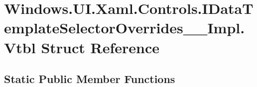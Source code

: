 \hypertarget{struct_windows_1_1_u_i_1_1_xaml_1_1_controls_1_1_i_data_template_selector_overrides_____impl_1_1_vtbl}{}\section{Windows.\+U\+I.\+Xaml.\+Controls.\+I\+Data\+Template\+Selector\+Overrides\+\_\+\+\_\+\+Impl.\+Vtbl Struct Reference}
\label{struct_windows_1_1_u_i_1_1_xaml_1_1_controls_1_1_i_data_template_selector_overrides_____impl_1_1_vtbl}
\subsection*{Static Public Member Functions}
